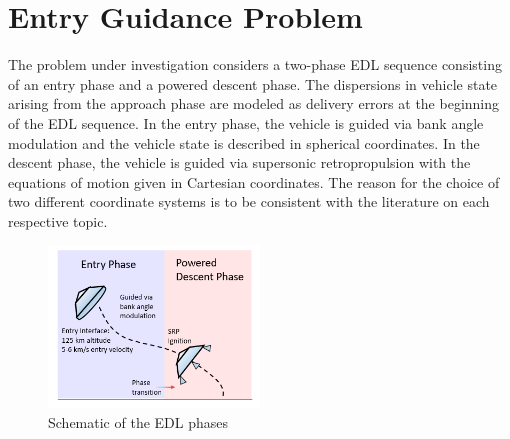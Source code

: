 \documentclass[letterpaper, paper,11pt]{AAS}
\begin{document}
\section{Entry Guidance Problem}
The problem under investigation considers a two-phase EDL sequence consisting of an entry phase and a powered descent phase. The dispersions in vehicle state arising from the approach phase are modeled as delivery errors at the beginning of the EDL sequence. In the entry phase, the vehicle is guided via bank angle modulation and the vehicle state is described in spherical coordinates. In the descent phase, the vehicle is guided via supersonic retropropulsion with the equations of motion given in Cartesian coordinates.  The reason for the choice of two different coordinate systems is to be consistent with the literature on each respective topic.

\begin{figure}[h!]
	\centering
	\includegraphics[width=0.5\textwidth]{EDLPhaseDiagram} 
	\caption{Schematic of the EDL phases}
	\label{fig_phases}
\end{figure}
\end{document}
